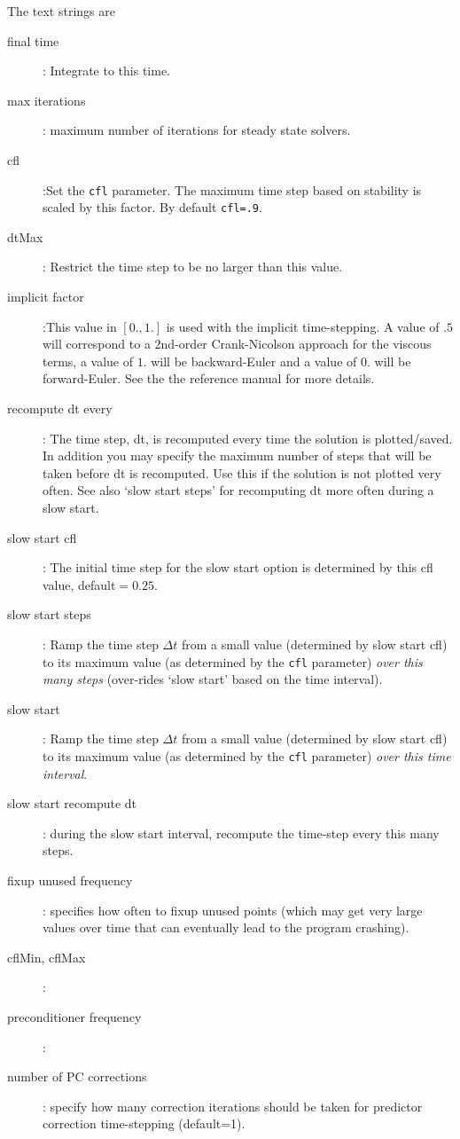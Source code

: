 \noindent The text strings are 
 \begin{description}
  \item[\qquad final time] : Integrate to this time.
  \item[\qquad max iterations] : maximum number of iterations for steady state solvers.
  \item[\qquad cfl] :Set the {\tt cfl} parameter. 
         The maximum time step based on stability is scaled by this factor.
         By default {\tt cfl=.9}.
  \item[\qquad dtMax] : Restrict the time step to be no larger than this value.
  \item[\qquad implicit factor] :This value in $[0.,1.]$ is used with the implicit time-stepping. A value
         of $.5$ will correspond to a 2nd-order Crank-Nicolson approach for the viscous terms,
        a value of $1.$ will be backward-Euler and a value of $0.$ will be forward-Euler. See 
        the the reference manual for more details.
  \item[\qquad recompute dt every] : The time step, dt,  is recomputed every time the solution is plotted/saved.
              In addition you may specify the maximum number of steps that will be taken
              before dt is recomputed. Use this if the solution is not plotted very often. See also `slow start steps' for
             recomputing dt more often during a slow start.
%
  \item[\qquad slow start cfl] : The initial time step for the slow start option is determined by this cfl value, default$=0.25$.
  \item[\qquad slow start steps] : Ramp the time step $\Delta t$ from a small value (determined by slow start cfl)
         to its maximum value (as  determined by the {\tt cfl} parameter) {\em over this many steps} (over-rides `slow start' based
         on the time interval). 
  \item[\qquad slow start] : Ramp the time step $\Delta t$ from a small value (determined by slow start cfl)
         to its maximum value (as  determined by the {\tt cfl} parameter) {\em over this time interval}.
  \item[\qquad slow start recompute dt] : during the slow start interval, recompute the time-step every this many steps.
% 
  \item[\qquad fixup unused frequency] : specifies how often to fixup unused points (which may get very large values
                over time that can eventually lead to the program crashing).
  \item[\qquad cflMin, cflMax] :
  \item[\qquad preconditioner frequency] :
  \item[\qquad number of PC corrections] : specify how many correction iterations should be taken for
             predictor correction time-stepping (default=1). 
\end{description}

